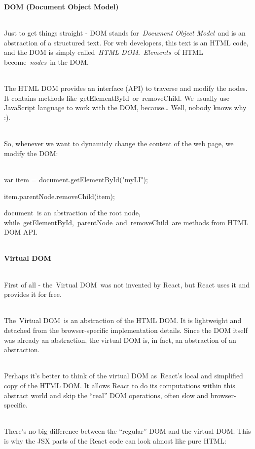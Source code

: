 \documentclass{article}
\begin{document}
\noindent \textbf{DOM (Document Object Model)}

\noindent\\
 Just to get things straight - DOM stands for~\textit{Document Object Model}~and is an abstraction of a structured text. For web developers, this text is an HTML code, and the DOM is simply called~\textit{HTML DOM}.~\textit{Elements}~of HTML become~\textit{nodes}~in the DOM.

\noindent\\
 The HTML DOM provides an interface (API) to traverse and modify the nodes. It contains methods like~getElementById~or~removeChild. We usually use JavaScript language to work with the DOM, because{\dots} Well, nobody knows why :).

\noindent\\
 So, whenever we want to dynamicly change the content of the web page, we modify the DOM:

\noindent\\
 var item = document.getElementById("myLI");

\noindent item.parentNode.removeChild(item);

\noindent document~is an abstraction of the root node, while~getElementById,~parentNode~and~removeChild~are methods from HTML DOM API.

\noindent 

\noindent 

\noindent \\
 
\noindent \textbf{Virtual DOM}

\noindent 
\\
 First of all - the~Virtual DOM~was not invented by React, but React uses it and provides it for free.

\noindent 
\\
The~Virtual DOM~is an abstraction of the HTML DOM. It is lightweight and detached from the browser-specific implementation details. Since the DOM itself was already an abstraction, the virtual DOM is, in fact, an abstraction of an abstraction.

\noindent 
 \\
 Perhaps it's better to think of the virtual DOM as~React's local and simplified copy of the HTML DOM. It allows React to do its computations within this abstract world and skip the ``real'' DOM operations, often slow and browser-specific.

\noindent 
\\
There's no big difference between the ``regular'' DOM and the virtual DOM. This is why the JSX parts of the React code can look almost like pure HTML:
\end{document}

